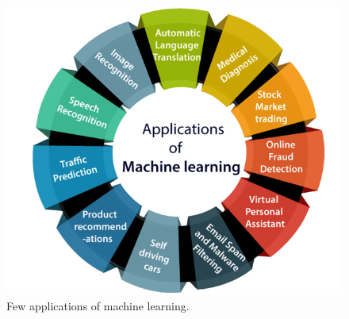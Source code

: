 \begin{figure}[htbp]
    \centering
    \includegraphics[width=0.5\linewidth]{figures/machine-learning-applications.png}
    \caption{Few applications of machine learning.}
    \label{fig:machine_learning_applications}
\end{figure}